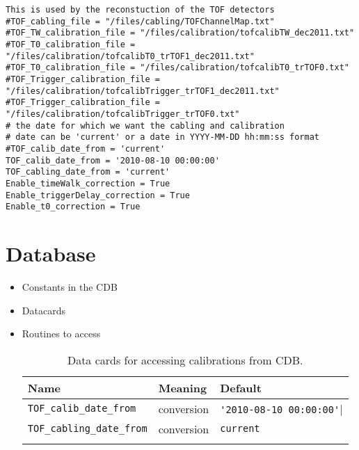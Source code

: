 \begin{verbatim}
This is used by the reconstuction of the TOF detectors
#TOF_cabling_file = "/files/cabling/TOFChannelMap.txt"
#TOF_TW_calibration_file = "/files/calibration/tofcalibTW_dec2011.txt"
#TOF_T0_calibration_file = "/files/calibration/tofcalibT0_trTOF1_dec2011.txt"
#TOF_T0_calibration_file = "/files/calibration/tofcalibT0_trTOF0.txt"
#TOF_Trigger_calibration_file = "/files/calibration/tofcalibTrigger_trTOF1_dec2011.txt"
#TOF_Trigger_calibration_file = "/files/calibration/tofcalibTrigger_trTOF0.txt"
# the date for which we want the cabling and calibration
# date can be 'current' or a date in YYYY-MM-DD hh:mm:ss format
#TOF_calib_date_from = 'current'
TOF_calib_date_from = '2010-08-10 00:00:00'
TOF_cabling_date_from = 'current'
Enable_timeWalk_correction = True
Enable_triggerDelay_correction = True
Enable_t0_correction = True
\end{verbatim}

\section{Database}
\begin{itemize}
\item Constants in the CDB
\item Datacards
\item Routines to access
\begin{table*}
\begin{center}
\caption{Data cards for accessing calibrations from CDB.}
\begin{tabularx}{\linewidth}{lXX}
\hline
Name & Meaning & Default\\
\hline
\verb|TOF_calib_date_from| & conversion & \verb|'2010-08-10 00:00:00'||\\
\verb|TOF_cabling_date_from| & conversion & \verb|current|\\
\begin{makeimage} %
\end{makeimage} 
\end{tabularx}
\end{center}
\end{table*}
\end{itemize}
